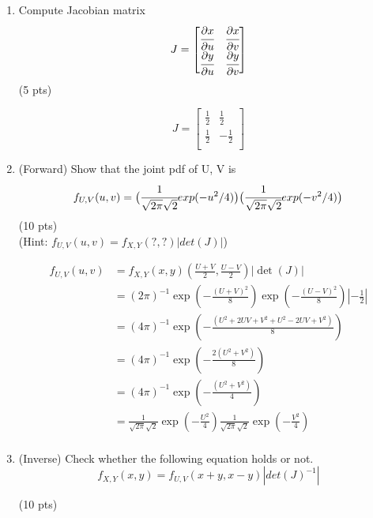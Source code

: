 \documentclass[a4paper]{article}
\theoremstyle{definition}
\newenvironment{soln}{
	\leavevmode\color{blue}\ignorespaces
}{}
\begin{document}
	\begin{enumerate}[label=(\alph*)]
		\item Compute Jacobian matrix $$J=\begin{bmatrix}
			\cfrac{\partial x}{\partial u} & \cfrac{\partial x}{\partial v}\\
			\cfrac{\partial y}{\partial u} & \cfrac{\partial y}{\partial v}
		\end{bmatrix}
		$$
		\hfill (5 pts)
		
		\begin{soln} 
			$$J = \begin{bmatrix}
				\frac{1}{2} & \frac{1}{2} \\
				\frac{1}{2} & -\frac{1}{2} \\
			\end{bmatrix}$$
		\end{soln}
		
		
		\item (Forward) Show that the joint pdf of U, V is
		$$f_{U, V}(u, v)=\big (\cfrac{1}{\sqrt{2\pi}\sqrt{2}}exp(-u^{2}/4)\big ) \big (\cfrac{1}{\sqrt{2\pi}\sqrt{2}}exp(-v^{2}/4)\big )$$
		\hfill (10 pts) \\
		(Hint: $f_{U, V}(u, v)=f_{X, Y}(?, ?)|det(J)|$) \\
		
		\begin{soln}
			$$ \begin{aligned}
				f_{U,V}(u,v) & = f_{X,Y}(x,y)\left(\frac{U+V}{2}, \frac{U-V}{2}\right)|\det(J)|\\
				& = (2\pi)^{-1}\exp\left(-\frac{(U+V)^2}{8}\right)\exp\left(-\frac{(U-V)^2}{8}\right) |-\frac{1}{2}|\\
				& = (4\pi)^{-1}\exp\left(-\frac{(U^2+2UV+V^2+U^2-2UV+V^2)}{8}\right) \\
				& = (4\pi)^{-1}\exp\left(-\frac{2(U^2+V^2)}{8}\right) \\ 
				& = (4\pi)^{-1}\exp\left(-\frac{(U^2+V^2)}{4}\right) \\ 
				& = \frac{1}{\sqrt{2\pi}\sqrt{2}}\exp\left(-\frac{U^2}{4}\right)\frac{1}{\sqrt{2\pi}\sqrt{2}}\exp\left(-\frac{V^2}{4}\right) \\
			\end{aligned} $$
		\end{soln}
		
		\item (Inverse) Check whether the following equation holds or not.
		$$f_{X, Y}(x, y)=f_{U, V}(x+y, x-y)|det(J)^{-1}|$$
		
		\hfill (10 pts) 
		

\end{enumerate}
\end{document}

